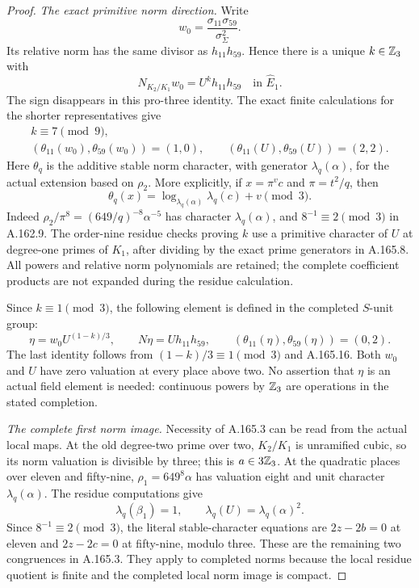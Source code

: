 \begin{proof}
\emph{The exact primitive norm direction.}
Write
\[
 w_0=\frac{\sigma_{11}\sigma_{59}}{\sigma_\Sigma^2}.
\]
Its relative norm has the same divisor as \(h_{11}h_{59}\).
Hence there is a unique \(k\in\mathbb Z_3\) with
\[
                    N_{K_2/K_1}w_0=U^k h_{11}h_{59}
                    \quad\text{in }\widehat E_1.
\tag{A.165.15}
\]
The sign disappears in this pro-three identity.
The exact finite calculations for the shorter representatives give
\[
 \begin{gathered}
 k\equiv7\pmod9,\\
 (\theta_{11}(w_0),\theta_{59}(w_0))=(1,0),\qquad
 (\theta_{11}(U),\theta_{59}(U))=(2,2).
 \end{gathered}
\tag{A.165.16}
\]
Here \(\theta_q\) is the additive stable norm character, with generator
\(\lambda_q(\alpha)\), for the actual extension based on \(\rho_2\).
More explicitly, if \(x=\pi^v c\) and \(\pi=t^2/q\), then
\[
 \theta_q(x)=
 \log_{\lambda_q(\alpha)}\lambda_q(c)+v\pmod3.
\tag{A.165.17}
\]
Indeed \(\rho_2/\pi^8=(649/q)^{-8}\alpha^{-5}\) has character
\(\lambda_q(\alpha)\), and \(8^{-1}\equiv2\pmod3\) in A.162.9.
The order-nine residue checks proving \(k\) use a primitive character
of \(U\) at degree-one primes of \(K_1\), after dividing by the exact
prime generators in A.165.8.  All powers and relative norm
polynomials are retained; the complete coefficient products are not
expanded during the residue calculation.

Since \(k\equiv1\pmod3\), the following element is defined in the
completed \(S\)-unit group:
\[
 \eta=w_0 U^{(1-k)/3},\qquad
 N\eta=U h_{11}h_{59},\qquad
 (\theta_{11}(\eta),\theta_{59}(\eta))=(0,2).
\tag{A.165.18}
\]
The last identity follows from
\((1-k)/3\equiv1\pmod3\) and A.165.16.
Both \(w_0\) and \(U\) have zero valuation at every place above two.
No assertion that \(\eta\) is an actual field element is needed:
continuous powers by \(\mathbb Z_3\) are operations in the stated completion.

\emph{The complete first norm image.}
Necessity of A.165.3 can be read from the actual local maps.
At the old degree-two prime over two, \(K_2/K_1\) is unramified cubic,
so its norm valuation is divisible by three; this is \(a\in3\mathbb Z_3\).
At the quadratic places over eleven and fifty-nine,
\(\rho_1=649^8\alpha\) has valuation eight and unit character
\(\lambda_q(\alpha)\).  The residue computations give
\[
 \lambda_q(\beta_1)=1,\qquad
 \lambda_q(U)=\lambda_q(\alpha)^2.
\]
Since \(8^{-1}\equiv2\pmod3\), the literal stable-character
equations are \(2z-2b=0\) at eleven and \(2z-2c=0\) at
fifty-nine, modulo three.
These are the remaining two congruences in A.165.3.
They apply to completed norms because the local residue quotient is
finite and the completed local norm image is compact.


\end{proof}
